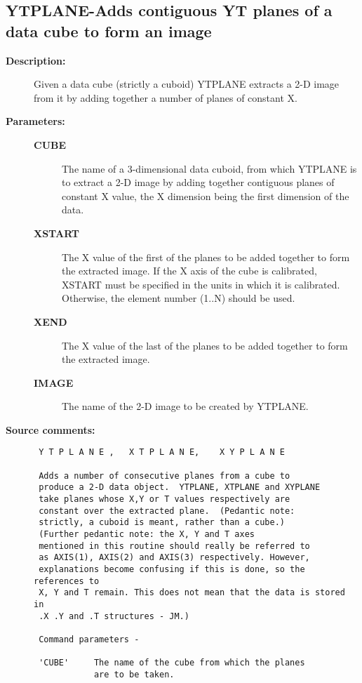 \subsection{YTPLANE-\label{YTPLANE}Adds contiguous YT planes of a data cube to form an image}
\begin{description}

\item [{\bf Description:}]
 Given a data cube (strictly a cuboid) YTPLANE extracts a 2-D image
 from it by adding together a number of planes of constant X.

\item [{\bf Parameters:}]
\begin{description}
\item [{\bf CUBE}]
 The name of a 3-dimensional data cuboid,
 from which YTPLANE is to extract a 2-D image by adding
 together contiguous planes of constant X value, the
 X dimension being the first dimension of the data.
\item [{\bf XSTART}]
 The X value of the first of the planes to
 be added together to form the extracted image.  If
 the X axis of the cube is calibrated, XSTART must be
 specified in the units in which it is calibrated.
 Otherwise, the element number (1..N) should be used.
\item [{\bf XEND}]
 The X value of the last of the planes to
 be added together to form the extracted image.
\item [{\bf IMAGE}]
 The name of the 2-D image to be created by YTPLANE.
\end{description}

\item [{\bf Source comments:}]
\begin{verbatim}
 Y T P L A N E ,   X T P L A N E,    X Y P L A N E

 Adds a number of consecutive planes from a cube to
 produce a 2-D data object.  YTPLANE, XTPLANE and XYPLANE
 take planes whose X,Y or T values respectively are
 constant over the extracted plane.  (Pedantic note:
 strictly, a cuboid is meant, rather than a cube.)
 (Further pedantic note: the X, Y and T axes
 mentioned in this routine should really be referred to
 as AXIS(1), AXIS(2) and AXIS(3) respectively. However,
 explanations become confusing if this is done, so the references to
 X, Y and T remain. This does not mean that the data is stored in
 .X .Y and .T structures - JM.)

 Command parameters -

 'CUBE'     The name of the cube from which the planes
            are to be taken.


\end{verbatim}
\end{description}
